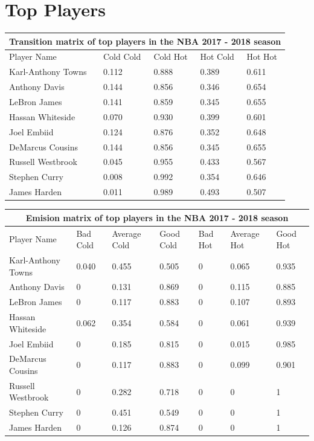 \documentclass[12pt, authoryear]{elsarticle}
\begin{document}
\section{Top Players}\label{top_players}

\begin{tabular}{ |p{3cm}||p{2cm}|p{2cm}|p{2cm}|p{2cm}|  }
	\hline
	\multicolumn{5}{|c|}{Transition matrix of top players in the NBA 2017 - 2018 season} \\
	\hline
	Player Name & Cold Cold & Cold Hot &Hot Cold & Hot Hot\\
	\hline
	Karl-Anthony Towns&   0.112 &	0.888 &	0.389 &	0.611\\
	Anthony Davis&   0.144&	0.856&	0.346&	0.654\\
	LeBron James &0.141&	0.859&	0.345&	0.655\\
	Hassan Whiteside    &	0.070&	0.930&	0.399&	0.601\\
	Joel Embiid&   0.124&	0.876&	0.352&	0.648\\
	DeMarcus Cousins& 0.144&	0.856&	0.345&	0.655\\
	Russell Westbrook& 0.045&	0.955&	0.433&	0.567\\
	Stephen Curry& 0.008&	0.992&	0.354&	0.646\\
	James Harden&  0.011&	0.989&	0.493&	0.507\\
	\hline
\end{tabular}

\begin{tabular}{ |p{3cm}||p{1.5cm}|p{1.5cm}|p{1.5cm}|p{1.5cm}|p{1.5cm}|p{1.5cm}|  }
	\hline
	\multicolumn{7}{|c|}{Emision matrix of top players in the NBA 2017 - 2018 season} \\
	\hline
	Player Name &Bad Cold& Average Cold&	Good Cold&	Bad Hot&	Average Hot&	Good Hot\\
	\hline
	Karl-Anthony Towns&   0.040&	0.455&	0.505&	0&	0.065&	0.935\\
	Anthony Davis&   0&	0.131&	0.869&	0&	0.115&	0.885\\
	LeBron James &0&	0.117&	0.883&	0&	0.107&	0.893\\
	Hassan Whiteside    &0.062&	0.354&	0.584&	0&	0.061&	0.939\\
	Joel Embiid& 0& 0.185&	0.815&	0&	0.015&	0.985\\
	DeMarcus Cousins& 0&	0.117&	0.883&	0&	0.099&	0.901\\
	Russell Westbrook& 0&	0.282&	0.718&	0&	0&	1\\
	Stephen Curry& 0&	0.451&	0.549&	0&	0&	1\\
	James Harden&  0&	0.126&	0.874&	0&	0&	1\\
	\hline
\end{tabular}
\end{document}
